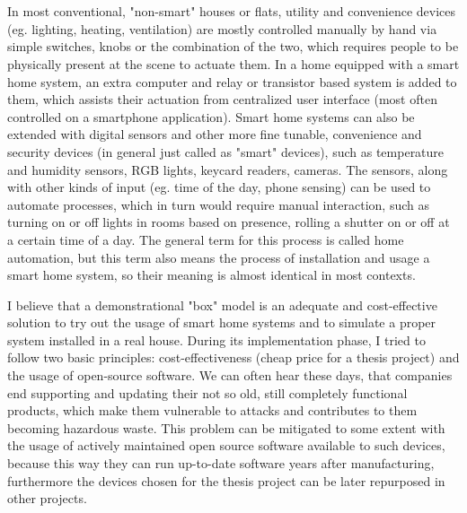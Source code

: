 \chapter{\bevezetes}



In most conventional, "non-smart" houses or flats, utility and convenience devices (eg. lighting, heating, ventilation) are mostly controlled manually by hand via simple switches, knobs or the combination of the two, which requires people to be physically present at the scene to actuate them. In a home equipped with a smart home system, an extra computer and relay or transistor based system is added to them, which assists their actuation from centralized user interface (most often controlled on a smartphone application). Smart home systems can also be extended with digital sensors and other more fine tunable, convenience and security devices (in general just called as "smart" devices), such as temperature and humidity sensors, RGB lights, keycard readers, cameras. The sensors, along with other kinds of input (eg. time of the day, phone sensing) can be used to automate processes, which in turn would require manual interaction, such as turning on or off lights in rooms based on presence, rolling a shutter on or off at a certain time of a day. The general term for this process is called home automation, but this term also means the process of installation and usage a smart home system, so their meaning is almost identical in most contexts. \break

I believe that a demonstrational "box" model is an adequate and cost-effective solution to try out the usage of smart home systems and to simulate a proper system installed in a real house. During its implementation phase, I tried to follow two basic principles: cost-effectiveness (cheap price for a thesis project) and the usage of open-source software. We can often hear these days, that companies end supporting and updating their not so old, still completely functional products, which make them vulnerable to attacks and contributes to them becoming hazardous waste. This problem can be mitigated to some extent with the usage of actively maintained open source software available to such devices, because this way they can run up-to-date software years after manufacturing, furthermore the devices chosen for the thesis project can be later repurposed in other projects.\break

